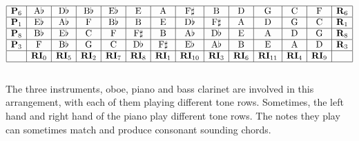 \documentclass{article}
\begin{document}
\[\begin{array}{|c|c|c|c|c|c|c|c|c|c|c|c|c|c|}
\hline
\mathbf{P}_6&\mathrm{A}\flat&\mathrm{D}\flat&\mathrm{B}\flat&\mathrm{E}\flat&\mathrm{E}&\mathrm{A}&\mathrm{F}\sharp&\mathrm{B}&\mathrm{D}&\mathrm{G}&\mathrm{C}&\mathrm{F}&\mathbf{R}_6\\
\hline
\mathbf{P}_1&\mathrm{E}\flat&\mathrm{A}\flat&\mathrm{F}&\mathrm{B}\flat&\mathrm{B}&\mathrm{E}&\mathrm{D}\flat&\mathrm{F}\sharp&\mathrm{A}&\mathrm{D}&\mathrm{G}&\mathrm{C}&\mathbf{R}_1\\
\hline
\mathbf{P}_8&\mathrm{B}\flat&\mathrm{E}\flat&\mathrm{C}&\mathrm{F}&\mathrm{F}\sharp&\mathrm{B}&\mathrm{A}\flat&\mathrm{D}\flat&\mathrm{E}&\mathrm{A}&\mathrm{D}&\mathrm{G}&\mathbf{R}_8\\
\hline
\mathbf{P}_3&\mathrm{F}&\mathrm{B}\flat&\mathrm{G}&\mathrm{C}&\mathrm{D}\flat&\mathrm{F}\sharp&\mathrm{E}\flat&\mathrm{A}\flat&\mathrm{B}&\mathrm{E}&\mathrm{A}&\mathrm{D}&\mathbf{R}_3\\
\hline
&\mathbf{RI}_0&\mathbf{RI}_5&\mathbf{RI}_2&\mathbf{RI}_7&\mathbf{RI}_8&\mathbf{RI}_1&\mathbf{RI}_{10}&\mathbf{RI}_3&\mathbf{RI}_6&\mathbf{RI}_{11}&\mathbf{RI}_4&\mathbf{RI}_9&\\
\hline
\end{array}\]
\\
The three instruments, oboe, piano and bass clarinet are involved in this arrangement, with each of them playing different tone rows. Sometimes, the left hand and right hand of the piano play different tone rows. The notes they play can sometimes match and produce consonant sounding chords.
\end{document}
